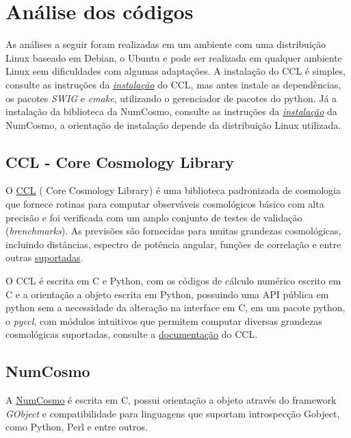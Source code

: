 	\chapter*{Análise dos códigos}

As análises a seguir foram realizadas em um ambiente com uma distribuição Linux baseado em Debian, o Ubuntu e pode ser realizada em qualquer ambiente Linux sem dificuldades com algumas adaptações. A instalação do CCL é simples, consulte as instruções da  \textit{\href{https://ccl.readthedocs.io/en/latest/source/installation.html}{\color{blue}instalação}} do CCL, mas antes instale as dependências, os pacotes \textit{SWIG} e \textit{cmake}, utilizando o gerenciador de pacotes do python. Já a instalação da biblioteca da NumCosmo, consulte as instruções da \textit{\href{https://numcosmo.github.io/download/}{\color{blue}instalação}} da NumCosmo, a orientação de instalação depende da distribuição Linux utilizada.

\section*{CCL - Core Cosmology Library}
O \href{https://ccl.readthedocs.io/en/latest/?badge=latest#core-cosmology-library}{\color{blue}CCL} ( Core Cosmology Library) é uma biblioteca padronizada de cosmologia que fornece rotinas para computar observáveis cosmológicos básico com alta precisão e foi verificada com um amplo conjunto de testes de validação (\textit{brenchmarks}). As previsões são fornecidas para muitas grandezas cosmológicas, incluindo distâncias, espectro de potência angular, funções de correlação e entre outras  \href{https://arxiv.org/abs/1812.05995}{\color{blue}suportadas}. 

O CCL é escrita em C e Python, com os códigos de cálculo numérico escrito em C e a orientação a objeto escrita em Python, possuindo uma API pública em python sem a necessidade da alteração na interface em C, em um pacote python, o \textit{pyccl}, com módulos intuitivos que permitem computar diversas grandezas cosmológicas suportadas, consulte a   \href{https://ccl.readthedocs.io/en/latest/api/modules.html}{\color{blue}documentação} do CCL.

\section*{NumCosmo}
A \href{https://numcosmo.github.io/about/}{\color{blue}NumCosmo}  é escrita em C, possui orientação a objeto através do framework \textit{GObject} e compatibilidade para linguagens que suportam introspecção Gobject, como Python, Perl e entre outros. 









